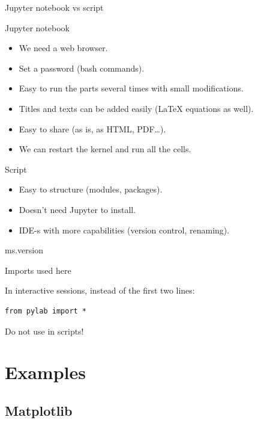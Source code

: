 \begin{frame}
    {Jupyter notebook vs script}

    Jupyter notebook
    \begin{itemize}
        \item We need a web browser.
        \item Set a password (bash commands).
        \item Easy to run the parts several times with small modifications.
        \item Titles and texts can be added easily (LaTeX equations as well).
        \item Easy to share (as is, as HTML, PDF\ldots).
        \item We can restart the kernel and run all the cells.
    \end{itemize}

    Script
    \begin{itemize}
        \item Easy to structure (modules, packages).
        \item Doesn't need Jupyter to install.
        \item IDE-s with more capabilities (version control, renaming).
    \end{itemize}
\end{frame}

\begin{frame}[fragile]
    {ms.version}

\end{frame}


\begin{frame}[fragile]
    {Imports used here}




In interactive sessions, instead of the first two lines:

\begin{Verbatim}
from pylab import *
\end{Verbatim}

Do not use in scripts!
\end{frame}


\section{Examples}
\subsection{Matplotlib}

